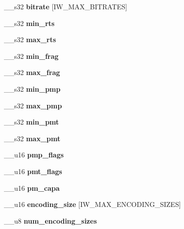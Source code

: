 \begin{DoxyCompactItemize}
\item 
\-\_\-\-\_\-s32 {\bfseries bitrate} [\-I\-W\-\_\-\-M\-A\-X\-\_\-\-B\-I\-T\-R\-A\-T\-E\-S]\label{structiw__range_a11fd35539afeaa123b05c7e6fe89c68f}

\item 
\-\_\-\-\_\-s32 {\bfseries min\-\_\-rts}\label{structiw__range_a1a989f3134f940b3af3a1a732ecdb214}

\item 
\-\_\-\-\_\-s32 {\bfseries max\-\_\-rts}\label{structiw__range_adf6323e6ed10098ac855b620965b926b}

\item 
\-\_\-\-\_\-s32 {\bfseries min\-\_\-frag}\label{structiw__range_a5c6fbecd745ef30944cdba4774cc24b0}

\item 
\-\_\-\-\_\-s32 {\bfseries max\-\_\-frag}\label{structiw__range_a5cea6f873f55dbce7520d80e09699b09}

\item 
\-\_\-\-\_\-s32 {\bfseries min\-\_\-pmp}\label{structiw__range_a42b310d33fbf431cc069c014506c2e52}

\item 
\-\_\-\-\_\-s32 {\bfseries max\-\_\-pmp}\label{structiw__range_a64fc548979f3a1be3607dc53009df287}

\item 
\-\_\-\-\_\-s32 {\bfseries min\-\_\-pmt}\label{structiw__range_a2a9329ad885157181cc54baacbde243e}

\item 
\-\_\-\-\_\-s32 {\bfseries max\-\_\-pmt}\label{structiw__range_a37dacaf4eda002bdf095f4caefafa508}

\item 
\-\_\-\-\_\-u16 {\bfseries pmp\-\_\-flags}\label{structiw__range_a85619e561bfb2afb39c72d8dbd707248}

\item 
\-\_\-\-\_\-u16 {\bfseries pmt\-\_\-flags}\label{structiw__range_ad8fd8a62b8c591116e5d45fee5c54474}

\item 
\-\_\-\-\_\-u16 {\bfseries pm\-\_\-capa}\label{structiw__range_ad726af7e7efd7c008abb57bd3892beb6}

\item 
\-\_\-\-\_\-u16 {\bfseries encoding\-\_\-size} [\-I\-W\-\_\-\-M\-A\-X\-\_\-\-E\-N\-C\-O\-D\-I\-N\-G\-\_\-\-S\-I\-Z\-E\-S]\label{structiw__range_adbc586d04752b83c720409e46151a94d}

\item 
\-\_\-\-\_\-u8 {\bfseries num\-\_\-encoding\-\_\-sizes}\label{structiw__range_aa001a602bc013069307f00f96f91acf8}


\end{DoxyCompactItemize}
